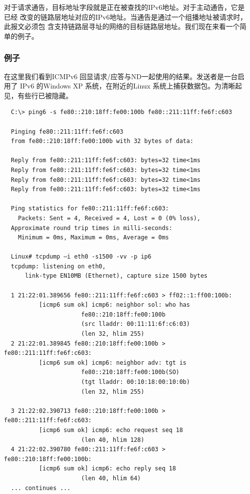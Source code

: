 对于请求通告，目标地址字段就是正在被查找的IPv6地址。对于主动通告，它是已经
改变的链路层地址对应的IPv6地址。当通告是通过一个组播地址被请求时，此报文必须包
含支持链路层寻址的网络的目标链路层地址。我们现在来看一个简单的例子。

\subsubsection{例子}

在这里我们看到ICMPv6 回显请求/应答与ND一起使用的结果。发送者是一台启用了
IPv6 的Windows XP 系统，在附近的Linux 系统上捕获数据包。为清晰起见，有些行已被隐藏。
\begin{verbatim}
  C:\> ping6 -s fe80::210:18ff:fe00:100b fe80::211:11ff:fe6f:c603

  Pinging fe80::211:11ff:fe6f:c603
  from fe80::210:18ff:fe00:100b with 32 bytes of data:

  Reply from fe80::211:11ff:fe6f:c603: bytes=32 time<1ms
  Reply from fe80::211:11ff:fe6f:c603: bytes=32 time<1ms
  Reply from fe80::211:11ff:fe6f:c603: bytes=32 time<1ms
  Reply from fe80::211:11ff:fe6f:c603: bytes=32 time<1ms

  Ping statistics for fe80::211:11ff:fe6f:c603:
    Packets: Sent = 4, Received = 4, Lost = 0 (0% loss),
  Approximate round trip times in milli-seconds:
    Minimum = 0ms, Maximum = 0ms, Average = 0ms

  Linux# tcpdump –i eth0 -s1500 -vv -p ip6
  tcpdump: listening on eth0,
      link-type EN10MB (Ethernet), capture size 1500 bytes

  1 21:22:01.389656 fe80::211:11ff:fe6f:c603 > ff02::1:ff00:100b:
          [icmp6 sum ok] icmp6: neighbor sol: who has
                      fe80::210:18ff:fe00:100b
                      (src lladdr: 00:11:11:6f:c6:03)
                      (len 32, hlim 255)
  2 21:22:01.389845 fe80::210:18ff:fe00:100b > fe80::211:11ff:fe6f:c603:
          [icmp6 sum ok] icmp6: neighbor adv: tgt is
                      fe80::210:18ff:fe00:100b(SO)
                      (tgt lladdr: 00:10:18:00:10:0b)
                      (len 32, hlim 255)

  3 21:22:02.390713 fe80::210:18ff:fe00:100b > fe80::211:11ff:fe6f:c603:
          [icmp6 sum ok] icmp6: echo request seq 18
                      (len 40, hlim 128)
  4 21:22:02.390780 fe80::211:11ff:fe6f:c603 > fe80::210:18ff:fe00:100b:
          [icmp6 sum ok] icmp6: echo reply seq 18
                      (len 40, hlim 64)
  ... continues ...
\end{verbatim}

